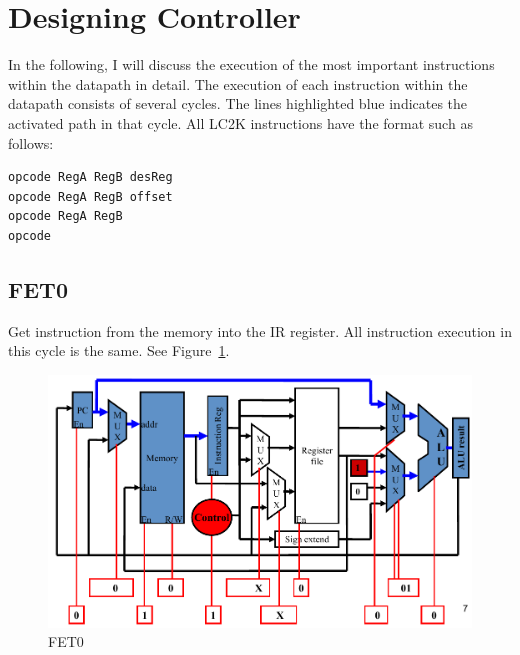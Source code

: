 \documentclass[a4paper]{article}
\begin{document}
\section{Designing Controller}
In the following, I will discuss the execution of the most important instructions within the datapath in detail. The execution of each instruction within the datapath consists of several cycles. The lines highlighted blue indicates the activated path in that cycle. All LC2K instructions have the format such as follows:
\begin{verbatim}
opcode RegA RegB desReg
opcode RegA RegB offset
opcode RegA RegB
opcode
\end{verbatim}

\subsection{FET0}\label{fec0}
Get instruction from the memory into the IR register. All instruction execution in this cycle is the same. See Figure~\ref{fig:fet0}.
\begin{figure}[ht!]
    \center
    \includegraphics[scale=0.4]{fet0}
    \caption{FET0}\label{fig:fet0}
\end{figure}
\end{document}
